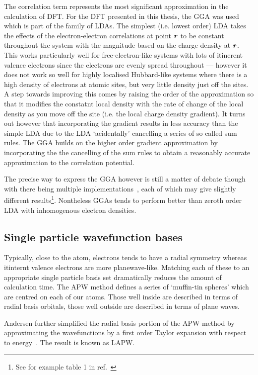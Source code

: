 The correlation term represents the most significant approximation in the calculation of \ac{DFT}. For the \ac{DFT} presented in this thesis, the \ac{GGA} was used which is part of the family of \acp{LDA}. The simplest (i.e. lowest order) \ac{LDA} takes the effects of the electron-electron correlations at point $\boldsymbol{r}$ to be constant throughout the system with the magnitude based on the charge density at $\boldsymbol{r}$. This works particularly well for free-electron-like systems with lots of itinerent valence electrons since the electrons are evenly spread throughout --- however it does not work so well for highly localised Hubbard-like systems where there is a high density of electrons at atomic sites, but very little density just off the sites. A step towards improving this comes by raising the order of the approximation so that it modifies the constatnt local density with the rate of change of the local density as you move off the site (i.e. the local charge density gradient). It turns out however that incorporating the gradient results in less accuracy than the simple \ac{LDA} due to the \ac{LDA} `acidentally' cancelling a series of so called sum rules. The \ac{GGA} builds on the higher order gradient approximation by incorporating the the cancelling of the sum rules to obtain a reasonably accurate approximation to the correlation potential. 

The precise way to express the \ac{GGA} however is still a matter of debate though with there being multiple implementations~\cite{Perdew1996, Perdew1986}, each of which may give slightly different results\footnote{See for example table 1 in ref.~\cite{Perdew1996}}. Nontheless \acp{GGA} tends to perform better than zeroth order \ac{LDA} with inhomogenous electron densities.

\subsection{Single particle wavefunction bases}

Typically, close to the atom, electrons tends to have a radial symmetry whereas itinternt valence electrons are more planewave-like. Matching each of these to an appropriate single particle basis set dramatically reduces the amount of calculation time. The \ac{APW} method defines a series of `muffin-tin spheres' which are centred on each of our atoms. Those well inside are described in terms of radial basis orbitals, those well outside are described in terms of plane waves.

Andersen further simplified the radial basis portion of the \ac{APW} method by approximating the wavefunctions by a first order Taylor expansion with respect to energy~\cite{Andersen1975}. The result is known as \ac{LAPW}.

